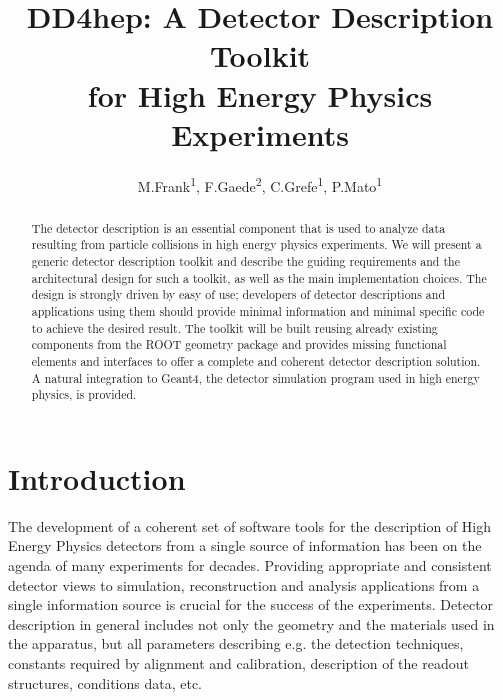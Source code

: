 \documentclass[a4paper]{jpconf}
\begin{document}
\title{DD4hep: A Detector Description Toolkit \\
for High Energy Physics Experiments}

\author{
M.Frank\textsuperscript{1},
F.Gaede\textsuperscript{2},
C.Grefe\textsuperscript{1},
P.Mato\textsuperscript{1}
}

\address{\textsuperscript{1} CERN, 1211 Geneva 23, Switzerland}
\address{\textsuperscript{2} Desy, 22607 Hamburg, Germany}


\begin{abstract}

\noindent
The detector description is an essential component that is used to analyze data
resulting from particle collisions in high energy physics experiments.
We will present a generic detector description toolkit
and describe the guiding requirements and the architectural design for
such a toolkit, as well as the main implementation choices.
The design is strongly driven by easy of use;
developers of detector descriptions and applications using
them should provide minimal information and minimal specific
code to achieve the desired result.
The toolkit will be built reusing already existing components
from the ROOT geometry package and provides missing functional
elements and interfaces to offer a complete and coherent
detector description solution. A natural integration to
Geant4, the detector simulation program used in high energy physics,
is provided.
\end{abstract}


\section{Introduction}
\label{sec:introduction}
\noindent
The development of a coherent set of software tools for the description of 
High Energy Physics detectors from a single source of information has been
on the agenda of many experiments for decades.
Providing appropriate and consistent detector views to simulation, 
reconstruction and analysis applications from a single information source
is crucial for the success of the experiments.
Detector description in general includes not only the geometry and the 
materials used in the apparatus, but all parameters describing e.g. the 
detection techniques, constants required by alignment and calibration, 
description of the readout structures, conditions data, etc. 
\end{document}
